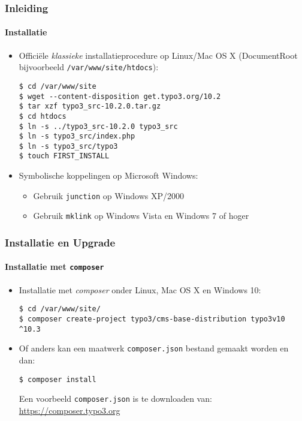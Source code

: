 
\begin{frame}[fragile]
	\frametitle{Inleiding}
	\framesubtitle{Installatie}

	\begin{itemize}
		\item Offici\"ele \textit{klassieke} installatieprocedure op Linux/Mac OS X\newline
		(DocumentRoot bijvoorbeeld \texttt{/var/www/site/htdocs}):
\begin{lstlisting}
$ cd /var/www/site
$ wget --content-disposition get.typo3.org/10.2
$ tar xzf typo3_src-10.2.0.tar.gz
$ cd htdocs
$ ln -s ../typo3_src-10.2.0 typo3_src
$ ln -s typo3_src/index.php
$ ln -s typo3_src/typo3
$ touch FIRST_INSTALL
\end{lstlisting}

		\item Symbolische koppelingen op Microsoft Windows:

			\begin{itemize}
				\item Gebruik \texttt{junction} op Windows XP/2000
				\item Gebruik \texttt{mklink} op Windows Vista en Windows 7 of hoger
			\end{itemize}

	\end{itemize}
\end{frame}


\begin{frame}[fragile]
	\frametitle{Installatie en Upgrade}
	\framesubtitle{Installatie met \texttt{composer}}

	\begin{itemize}
		\item Installatie met \textit{composer} onder Linux, Mac OS X en Windows 10:

\begin{lstlisting}
$ cd /var/www/site/
$ composer create-project typo3/cms-base-distribution typo3v10 ^10.3
\end{lstlisting}

		\item Of anders kan een maatwerk \texttt{composer.json} bestand gemaakt worden en dan:

\begin{lstlisting}
$ composer install
\end{lstlisting}

			Een voorbeeld \texttt{composer.json} is te downloaden van:\newline
			\smaller
				\href{https://composer.typo3.org}{https://composer.typo3.org}
			\normalsize

	\end{itemize}
\end{frame}

